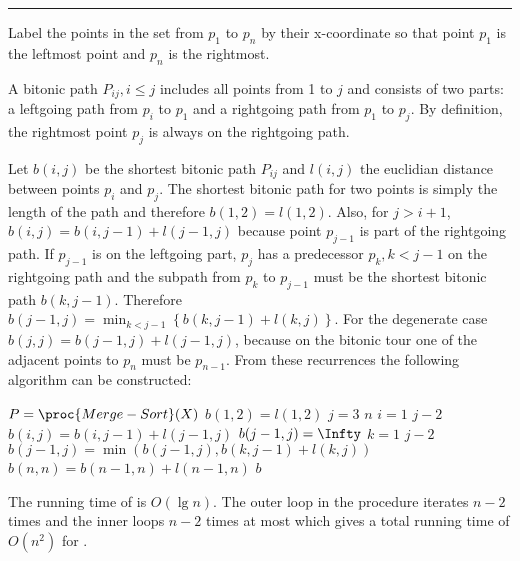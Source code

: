 \documentclass[a4paper,parskip=half]{scrartcl}
\newenvironment{solution}[1]{
\rule{\textwidth}{1pt}
\begin{description}[leftmargin=3em, style=nextline, topsep=0em,
font={\bfseries\rmfamily}]
\item[#1]
}{
\end{description}
}
\begin{document}
\begin{solution}{II-3}

Label the points in the set from $p_1$ to $p_n$ by their x-coordinate so that
point $p_1$ is the leftmost point and $p_n$ is the rightmost.

A bitonic path $P_{ij}, i \leq j$ includes all points from 1 to $j$ and
consists of two parts: a leftgoing path from $p_i$ to $p_1$ and a rightgoing
path from $p_1$ to $p_j$. By definition, the rightmost point $p_j$ is always on
the rightgoing path.

Let $b(i, j)$ be the shortest bitonic path $P_{ij}$ and $l(i, j)$ the euclidian
distance between points $p_i$ and $p_j$. The shortest bitonic path for two
points is simply the length of the path and therefore $b(1,2) = l(1,2)$.  Also,
for $j > i+1$, $b(i, j) = b(i, j-1) + l(j-1,j)$ because point $p_{j-1}$ is part
of the rightgoing path. If $p_{j-1}$ is on the leftgoing part, $p_j$ has a
predecessor $p_k, k < j-1$ on the rightgoing path and the subpath from $p_k$ to
$p_{j-1}$ must be the shortest bitonic path $b(k,j-1)$. Therefore $b(j-1,j) =
\min_{k<j-1} \left\{ b(k,j-1) + l(k,j) \right\}$. For the degenerate case $b(j,
j) = b(j-1,j) + l(j-1,j)$, because on the bitonic tour one of the adjacent
points to $p_n$ must be $p_{n-1}$. From these recurrences the following
algorithm can be constructed:

\begin{codebox}
\li $P = \proc{Merge-Sort}(X)$
\li $b(1,2) = l(1,2)$
\li \For $j = 3$ \To $n$ \Do
\li   \For $i = 1$ \To $j-2$ \Do
\li     $b(i,j) = b(i,j-1) + l(j-1,j)$ \End
\li   $b(j-1,j) = \Infty$
\li   \For $k = 1$ \To $j-2$ \Do
\li     $b(j-1,j) = \min(b(j-1,j), b(k,j-1) + l(k,j))$ \End \End
\li $b(n,n) = b(n-1,n)+l(n-1,n)$
\li \Return $b$
\end{codebox}

The running time of  is $O(\lg n)$. The outer loop in the
procedure iterates $n-2$ times and the inner loops $n-2$ times at most which
gives a total running time of $O(n^2)$ for .

\end{solution}
\end{document}

